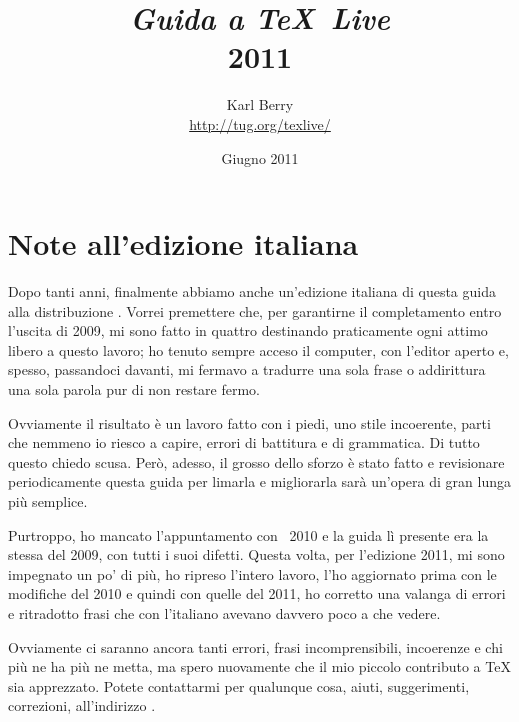 \documentclass{article}
\begin{document}
\title{%
  {\huge \textit{Guida a \TeX\ Live}\\\smallskip}%
  {\LARGE \textsf{\TL{} 2011}}%
}

\author{Karl Berry\\[3mm]
        \url{http://tug.org/texlive/}
       }

\date{Giugno 2011}

\maketitle

\begin{multicols}{2}
\tableofcontents
\end{multicols}


\section*{Note all'edizione italiana}

Dopo tanti anni, finalmente abbiamo anche un'edizione italiana di questa
guida alla distribuzione \TL. Vorrei premettere che, per garantirne il
completamento entro l'uscita di \TL{} 2009, mi sono fatto in quattro
destinando praticamente ogni attimo libero a questo lavoro; ho tenuto
sempre acceso il computer, con l'editor aperto e, spesso, passandoci
davanti, mi fermavo a tradurre una sola frase o addirittura una sola
parola pur di non restare fermo.

Ovviamente il risultato è un lavoro fatto con i piedi, uno stile
incoerente, parti che nemmeno io riesco a capire, errori di battitura e di
grammatica. Di tutto questo chiedo scusa. Però, adesso, il grosso dello
sforzo è stato fatto e revisionare periodicamente questa guida per limarla
e migliorarla sarà un'opera di gran lunga più semplice.

Purtroppo, ho mancato l'appuntamento con \TL\ 2010 e la guida lì presente
era la stessa del 2009, con tutti i suoi difetti. Questa volta, per
l'edizione 2011, mi sono impegnato un po' di più, ho ripreso l'intero
lavoro, l'ho aggiornato prima con le modifiche del 2010 e quindi con quelle
del 2011, ho corretto una valanga di errori e ritradotto frasi che con
l'italiano avevano davvero poco a che vedere.

Ovviamente ci saranno ancora tanti errori, frasi incomprensibili, incoerenze
e chi più ne ha più ne metta, ma spero nuovamente che il mio piccolo
contributo a \TeX{} sia apprezzato. Potete contattarmi per qualunque cosa,
aiuti, suggerimenti, correzioni, all'indirizzo
.
\end{document}

